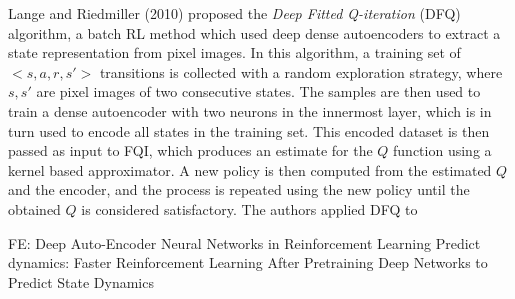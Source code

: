 Lange and Riedmiller (2010) \cite{lange2010deep} proposed the \textit{Deep 
Fitted Q-iteration} (DFQ) algorithm, a batch RL method which used deep dense 
autoencoders to extract a state representation from pixel images. 
In this algorithm, a training set of $<s, a, r, s'>$ transitions is collected
with a random exploration strategy, where $s, s'$ are pixel images of two 
consecutive states. The samples are then used to train a dense autoencoder with 
two neurons in the innermost layer, which is in turn used to encode all states 
in the training set. This encoded dataset is then passed as input to FQI, 
which produces an estimate for the $Q$ function using a kernel based 
approximator. A new policy is then computed from the estimated $Q$ and the 
encoder, and the process is repeated using the new policy until the obtained 
$Q$ is considered satisfactory.
The authors applied DFQ to 

FE: Deep Auto-Encoder Neural Networks in Reinforcement Learning
Predict dynamics: Faster Reinforcement Learning After Pretraining Deep Networks to Predict State Dynamics


























